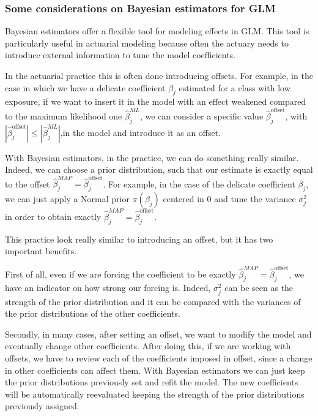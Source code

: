 \documentclass[a4paper, nobind]{templates/ociamthesis}
\theoremstyle{definition}
\theoremstyle{definition}
\theoremstyle{definition}
\theoremstyle{remark}
\begin{document}
\hypertarget{some-considerations-on-bayesian-estimators-for-glm}{%
\subsubsection{Some considerations on Bayesian estimators for GLM}\label{some-considerations-on-bayesian-estimators-for-glm}}

Bayesian estimators offer a flexible tool for modeling effects in GLM. This tool is particularly useful in actuarial modeling because often the actuary needs to introduce external information to tune the model coefficients.

In the actuarial practice this is often done introducing offsets. For example, in the case in which we have a delicate coefficient \(\beta_j\) estimated for a class with low exposure, if we want to insert it in the model with an effect weakened compared to the maximum likelihood one \(\hat{\beta}_j^{ML}\), we can consider a specific value \(\hat{\beta}_j^{\text{offset}}\), with \(|\hat{\beta}_j^{\text{offset}}| \le |\hat{\beta}_j^{ML}|\),in the model and introduce it as an offset.

With Bayesian estimators, in the practice, we can do something really similar. Indeed, we can choose a prior distribution, such that our estimate is exactly equal to the offset \(\hat{\beta}_j^{MAP} = \hat{\beta}_j^{\text{offset}}\). For example, in the case of the delicate coefficient \(\beta_j\), we can just apply a Normal prior \(\pi(\beta_j)\) centered in \(0\) and tune the variance \(\sigma_j^2\) in order to obtain exactly \(\hat{\beta}_j^{MAP} = \hat{\beta}_j^{\text{offset}}\).

This practice look really similar to introducing an offset, but it has two important benefits.

First of all, even if we are forcing the coefficient to be exactly \(\hat{\beta}_j^{MAP} = \hat{\beta}_j^{\text{offset}}\), we have an indicator on how strong our forcing is. Indeed, \(\sigma_j^2\) can be seen as the strength of the prior distribution and it can be compared with the variances of the prior distributions of the other coefficients.

Secondly, in many cases, after setting an offset, we want to modify the model and eventually change other coefficients. After doing this, if we are working with offsets, we have to review each of the coefficients imposed in offset, since a change in other coefficients can affect them. With Bayesian estimators we can just keep the prior distributions previously set and refit the model. The new coefficients will be automatically reevaluated keeping the strength of the prior distributions previously assigned.
\end{document}
